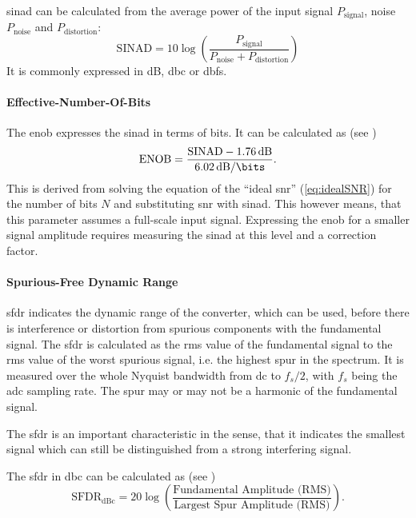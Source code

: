 \gls{sinad} can be calculated from the average power of the input signal $P_\text{signal}$, noise $P_\text{noise}$ and $P_\text{distortion}$:
\begin{equation}
	\text{SINAD} = 10 \log \left( \frac{P_\text{signal}}{P_\text{noise} + P_\text{distortion}} \right)
\end{equation}
It is commonly expressed in dB, \gls{dbc} or \gls{dbfs}.

\paragraph{Effective-Number-Of-Bits}
The \gls{enob} expresses the \gls{sinad} in terms of bits. It can be calculated as (see \cite{walt2009})
\begin{equation}
	\text{ENOB} = \frac{\text{SINAD}-\SI{1.76}{\decibel}}{\SI{6.02}{\decibel \per \bits}}. 
\end{equation}
This is derived from solving the equation of the ``ideal \gls{snr}'' (\autoref{eq:idealSNR}) for the number of bits $N$ and substituting \gls{snr} with \gls{sinad}.
This however means, that this parameter assumes a full-scale input signal. Expressing the \gls{enob} for a smaller signal amplitude requires measuring the \gls{sinad} at this level and a correction factor. \cite{walt}

\paragraph{Spurious-Free Dynamic Range}
\gls{sfdr} indicates the dynamic range of the converter, which can be used, before there is interference or distortion from spurious components with the fundamental signal. \cite{Lundberg} 
The \gls{sfdr} is calculated as the \gls{rms} value of the fundamental signal to the \gls{rms} value of the worst spurious signal, i.e. the highest spur in the spectrum.
It is measured over the whole Nyquist bandwidth from \gls{dc} to $f_s/2$, with $f_s$ being the \gls{adc} sampling rate. The spur may or may not be a harmonic of the fundamental signal. \cite{walt2009, Lundberg}

The \gls{sfdr} is an important characteristic in the sense, that it indicates the smallest signal which can still be distinguished from a strong interfering signal. \cite{walt2009} 

The \gls{sfdr} in \gls{dbc} can be calculated as (see \cite{xilinx_adc})%
\begin{equation}
	\text{SFDR}_\text{dBc} = 20 \log \left( \frac{\text{Fundamental Amplitude (RMS)}}{\text{Largest Spur Amplitude (RMS)}} \right).
\end{equation}


